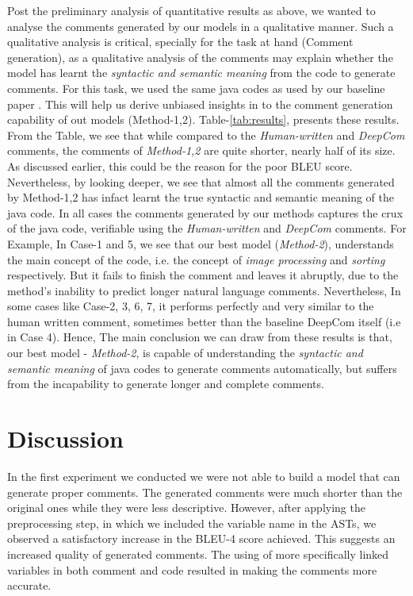 \documentclass[a4paper,10pt]{article}
\theoremstyle{plain}
\theoremstyle{definition}
\begin{document}
\restoregeometry
\begin{multicols*}{2}

Post the preliminary analysis of quantitative results as above, we wanted to analyse the comments generated by our models in a qualitative manner. Such a qualitative analysis is critical, specially for the task at hand (Comment generation), as a qualitative analysis of the comments may explain whether the model has learnt the \textit{syntactic and semantic meaning} from the code to generate comments. For this task, we used the same java codes as used by our baseline paper \cite{hu2018deep}. This will help us derive unbiased insights in to the comment generation capability of out models (Method-1,2). Table-\ref{tab:results}, presents these results. From the Table, we see that while compared to the \textit{Human-written} and \textit{DeepCom} comments, the comments of \textit{Method-1,2} are quite shorter, nearly half of its size. As discussed earlier, this could be the reason for the poor BLEU score. Nevertheless, by looking deeper, we see that almost all the comments generated by Method-1,2 has infact learnt the true syntactic and semantic meaning of the java code. In all cases the comments generated by our methods captures the crux of the java code, verifiable using the  \textit{Human-written} and \textit{DeepCom} comments. For Example, In Case-1 and 5, we see that our best model (\textit{Method-2}), understands the main concept of the code, i.e. the concept of \textit{image processing} and \textit{sorting} respectively. But it fails to finish the comment and leaves it abruptly, due to the method's inability to predict longer natural language comments. Nevertheless, In some cases like Case-2, 3, 6, 7, it performs perfectly and very similar to the human written comment, sometimes better than the baseline DeepCom itself (i.e in Case 4). Hence, The main conclusion we can draw from these results is that, our best model - \textit{Method-2}, is capable of understanding the \textit{syntactic and semantic meaning} of java codes to generate comments automatically, but suffers from the incapability to generate longer and complete comments.



\section{Discussion}
\label{discussion}

In the first experiment we conducted we were not able to build a model that can generate proper comments. The generated comments were much shorter than the original ones while they were less descriptive. However, after applying the preprocessing step, in which we included the variable name in the ASTs, we observed a satisfactory increase in the BLEU-4 score achieved. This suggests an increased quality of generated comments. The using of more specifically linked variables in both comment and code resulted in making the comments more accurate. 


\end{multicols*}
\end{document}
